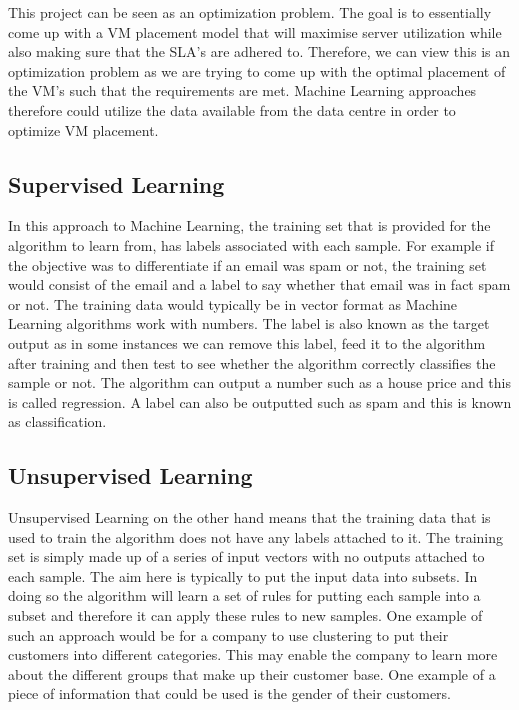 \documentclass[oneside,12pt]{Classes/RoboticsLaTeX}
\begin{document}
This project can be seen as an optimization problem. The goal is to essentially come up with a VM placement model that will maximise server utilization while also making sure that the SLA's are adhered to. Therefore, we can view this is an optimization problem as we are trying to come up with the optimal placement of the VM's such that the requirements are met. Machine Learning approaches therefore could utilize the data available from the data centre in order to optimize VM placement. 

\subsection{Supervised Learning}
In this approach to Machine Learning, the training set that is provided for the algorithm to learn from, has labels associated with each sample. For example if the objective was to differentiate if an email was spam or not, the training set would consist of the email and a label to say whether that email was in fact spam or not. The training data would typically be in vector format as Machine Learning algorithms work with numbers. The label is also known as the target output as in some instances we can remove this label, feed it to the algorithm after training and then test to see whether the algorithm correctly classifies the sample or not. The algorithm can output a number such as a house price and this is called regression. A label can also be outputted such as spam and this is known as classification. 

\subsection{Unsupervised Learning}
Unsupervised Learning on the other hand means that the training data that is used to train the algorithm does not have any labels attached to it. The training set is simply made up of a series of input vectors with no outputs attached to each sample. The aim here is typically to put the input data into subsets. In doing so the algorithm will learn a set of rules for putting each sample into a subset and therefore it can apply these rules to new samples. One example of such an approach would be for a company to use clustering to put their customers into different categories. This may enable the company to learn more about the different groups that make up their customer base. One example of a piece of information that could be used is the gender of their customers. 
\end{document}
